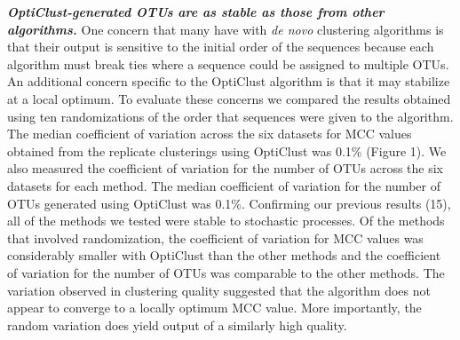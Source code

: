 \documentclass[11pt,]{article}
\begin{document}
\textbf{\emph{OptiClust-generated OTUs are as stable as those from other
algorithms.}} One concern that many have with \emph{de novo} clustering
algorithms is that their output is sensitive to the initial order of the
sequences because each algorithm must break ties where a sequence could
be assigned to multiple OTUs. An additional concern specific to the
OptiClust algorithm is that it may stabilize at a local optimum. To
evaluate these concerns we compared the results obtained using ten
randomizations of the order that sequences were given to the algorithm.
The median coefficient of variation across the six datasets for MCC
values obtained from the replicate clusterings using OptiClust was 0.1\%
(Figure 1). We also measured the coefficient of variation for the number
of OTUs across the six datasets for each method. The median coefficient
of variation for the number of OTUs generated using OptiClust was 0.1\%.
Confirming our previous results (15), all of the methods we tested were
stable to stochastic processes. Of the methods that involved
randomization, the coefficient of variation for MCC values was
considerably smaller with OptiClust than the other methods and the
coefficient of variation for the number of OTUs was comparable to the
other methods. The variation observed in clustering quality suggested
that the algorithm does not appear to converge to a locally optimum MCC
value. More importantly, the random variation does yield output of a
similarly high quality.
\end{document}

